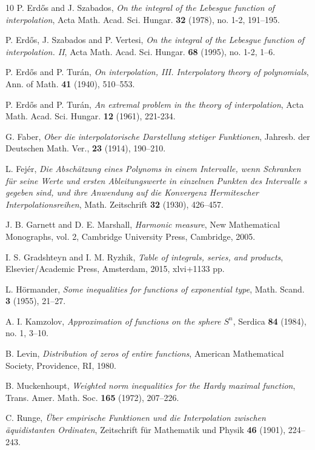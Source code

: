 \documentclass[12pt]{amsart}
\begin{document}
\begin{thebibliography}{10}
P. Erd\H{o}s and J. Szabados, \emph{On the integral of the Lebesgue function of interpolation}, Acta Math. Acad. Sci. Hungar. \textbf{32} (1978), no. 1-2, 191--195.

P. Erd\H{o}s, J. Szabados and P. Vertesi, \emph{On the integral of the Lebesgue function of interpolation. II}, Acta Math. Acad. Sci. Hungar. \textbf{68} (1995), no. 1-2, 1--6.

P. Erd\H{o}s and P. Tur\'an, \emph{On interpolation, III.  Interpolatory theory of polynomials}, Ann. of Math. \textbf{41} (1940), 510--553.

P. Erd\H{o}s and P. Tur\'an, \emph{An extremal problem in the theory of interpolation}, Acta Math. Acad. Sci. Hungar. \textbf{12} (1961), 221-234.

G. Faber, \emph{Ober die interpolatorische Darstellung stetiger Funktionen}, Jahresb. der Deutschen Math. Ver., \textbf{23} (1914), 190--210.

L. Fej\'er, \emph{Die Absch\"atzung eines Polynoms in einem Intervalle, wenn Schranken f\"ur seine Werte und ersten Ableitungswerte in einzelnen Punkten des Intervalle s gegeben sind, und ihre Anwendung auf die Konvergenz Hermitescher Interpolationsreihen}, Math. Zeitschrift \textbf{32} (1930), 426--457.

J. B. Garnett and D. E. Marshall, \emph{Harmonic measure}, New Mathematical Monographs, vol. 2, Cambridge University Press, Cambridge, 2005.

I. S. Gradshteyn and I. M. Ryzhik, \emph{Table of integrals, series, and products}, Elsevier/Academic Press, Amsterdam, 2015, xlvi+1133 pp.

L. H\"ormander, \emph{Some inequalities for functions of exponential type}, Math. Scand. \textbf{3} (1955), 21--27.

A. I. Kamzolov, \emph{Approximation of functions on the sphere $S^n$}, Serdica \textbf{84} (1984), no. 1, 3--10.

B. Levin, \emph{Distribution of zeros of entire functions}, American Mathematical Society, Providence, RI, 1980.

B. Muckenhoupt, \emph{Weighted norm inequalities for the Hardy maximal function}, Trans. Amer. Math. Soc. \textbf{165} (1972), 207--226.

C. Runge, \emph{\"Uber empirische Funktionen und die Interpolation zwischen äquidistanten Ordinaten}, Zeitschrift für Mathematik und Physik \textbf{46} (1901), 224--243.


\end{thebibliography}
\end{document}
